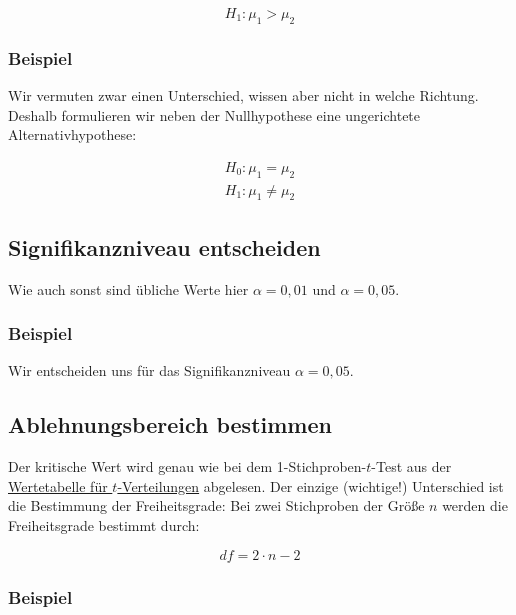 \documentclass[
  11pt,
  ngerman,
  a4paper,
]{report}
\begin{document}
\[
H_1 : \mu_1 > \mu_2
\label{eq:h21g}
\]

\hypertarget{beispiel-12}{%
\subsubsection{Beispiel}\label{beispiel-12}}

Wir vermuten zwar einen Unterschied, wissen aber nicht in welche Richtung. Deshalb formulieren wir neben der Nullhypothese eine ungerichtete Alternativhypothese:

\[\begin{aligned}
H_0 : \mu_1 = \mu_2\\
H_1 : \mu_1 \neq \mu_2
\end{aligned}\]

\hypertarget{signifikanzniveau-entscheiden-2}{%
\subsection{Signifikanzniveau entscheiden}\label{signifikanzniveau-entscheiden-2}}

Wie auch sonst sind übliche Werte hier \(\alpha=0{,}01\) und \(\alpha=0{,}05\).

\hypertarget{beispiel-13}{%
\subsubsection{Beispiel}\label{beispiel-13}}

Wir entscheiden uns für das Signifikanzniveau \(\alpha=0{,}05\).

\hypertarget{ablehnungsbereich-bestimmen-2}{%
\subsection{Ablehnungsbereich bestimmen}\label{ablehnungsbereich-bestimmen-2}}

Der kritische Wert wird genau wie bei dem 1-Stichproben-\(t\)-Test aus der \protect\hyperlink{tabelle-t}{Wertetabelle für \(t\)-Verteilungen} abgelesen. Der einzige (wichtige!) Unterschied ist die Bestimmung der Freiheitsgrade: Bei zwei Stichproben der Größe \(n\) werden die Freiheitsgrade bestimmt durch:

\[
\mathit{df}=2\cdot n - 2
\label{eq:df2sp}
\]

\hypertarget{beispiel-14}{%
\subsubsection{Beispiel}\label{beispiel-14}}
\end{document}
